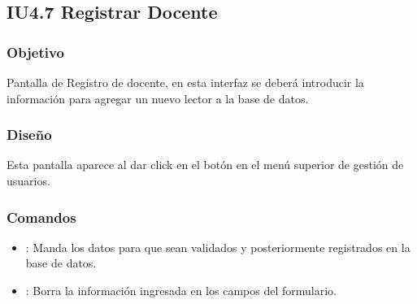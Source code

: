 \newpage
\subsection{IU4.7 Registrar Docente}

\subsubsection{Objetivo}
	Pantalla de Registro de docente, en esta interfaz se deberá introducir la información para agregar un nuevo lector a la base de datos. 

\subsubsection{Diseño}
	Esta pantalla aparece al dar click en el botón  en el menú superior de gestión de usuarios.  \\


\subsubsection{Comandos}
	\begin{itemize}
		\item {}: Manda los datos para que sean validados y posteriormente registrados en la base de datos.
		\item {}: Borra la información ingresada en los campos del formulario.  
	\end{itemize}

